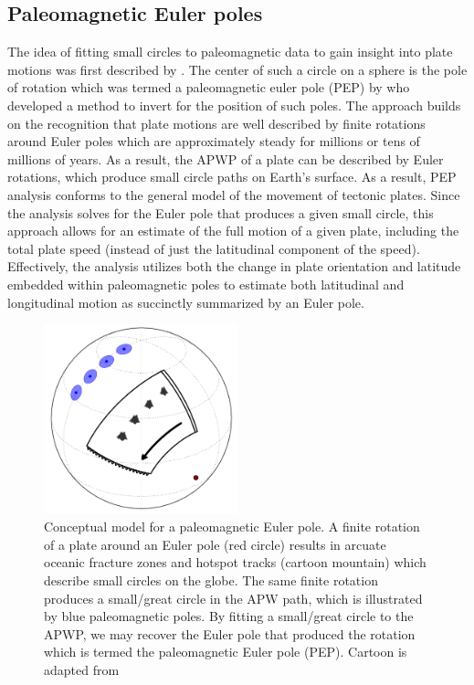 \documentclass[11pt,letterpaper]{article}
\begin{document}
\subsection*{Paleomagnetic Euler poles}
The idea of fitting small circles to paleomagnetic data to gain insight into plate motions was first described by \citet{Francheteau1969a}. The center of such a circle on a sphere is the pole of rotation which was termed a paleomagnetic euler pole (PEP) by \citet{Gordon1984a} who developed a method to invert for the position of such poles. The approach builds on the recognition that plate motions are well described by finite rotations around Euler poles which are approximately steady for millions or tens of millions of years. As a result, the APWP of a plate can be described by Euler rotations, which produce small circle paths on Earth's surface. As a result, PEP analysis conforms to the general model of the movement of tectonic plates. Since the analysis solves for the Euler pole that produces a given small circle, this approach allows for an estimate of the full motion of a given plate, including the total plate speed (instead of just the latitudinal component of the speed). Effectively, the analysis utilizes both the change in plate orientation and latitude embedded within paleomagnetic poles to estimate both latitudinal and longitudinal motion as succinctly summarized by an Euler pole.

\begin{figure}
\includegraphics[width=0.5\textwidth]{fig_paleomagnetic_euler_pole.png}
\caption{Conceptual model for a paleomagnetic Euler pole. A finite rotation of a plate around an Euler pole (red circle) results in arcuate oceanic fracture zones and hotspot tracks (cartoon mountain) which describe small circles on the globe. The same finite rotation produces a small/great circle in the APW path, which is illustrated by blue paleomagnetic poles. By fitting a small/great circle to the APWP, we may recover the Euler pole that produced the rotation which is termed the paleomagnetic Euler pole (PEP). Cartoon is adapted from \citet{Gordon1984a}}
\label{fig:pep}
\end{figure}
\end{document}
